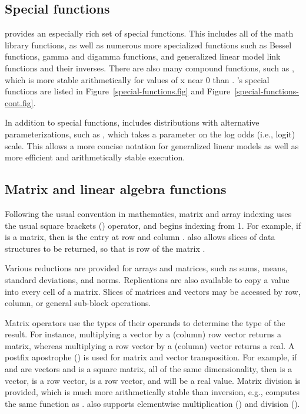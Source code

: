 \documentclass[article]{jss}
\begin{document}
\subsection{Special functions}

 provides an especially rich set of special functions.
This includes all of the  math library functions, as
well as numerous more specialized functions such as Bessel functions,
gamma and digamma functions, and generalized linear model link
functions and their inverses.  There are also many compound functions,
such as , which is more stable arithmetically for
values of x near 0 than .  's special
functions are listed in Figure~\ref{special-functions.fig} and
Figure~\ref{special-functions-cont.fig}.  

In addition to special functions,  includes distributions with
alternative parameterizations, such as , which
takes a parameter on the log odds (i.e., logit) scale.  This allows a
more concise notation for generalized linear models as well as more
efficient and arithmetically stable execution.  


\subsection{Matrix and linear algebra functions}

Following the usual convention in mathematics, matrix and array
indexing uses the usual square brackets (\code{[ ]}) operator, and
begins indexing from 1.  For example, if  is a matrix,
then  is the entry at row  and column
.   also allows slices of data structures to be
returned, so that  is row  of the matrix
.  

Various reductions are provided for arrays and matrices, such as sums,
means, standard deviations, and norms.  Replications are also available
to copy a value into every cell of a matrix.  Slices of matrices and
vectors may be accessed by row, column, or general sub-block
operations.

Matrix operators use the types of their operands to determine the type
of the result.  For instance, multiplying a vector by a (column) row
vector returns a matrix, whereas multiplying a row vector by a
(column) vector returns a real.  A postfix apostrophe () is
used for matrix and vector transposition.  For example, if 
and  are vectors and  is a square matrix, all of
the same dimensionality, then  is a vector,  is a row vector,  is a row vector, and
 will be a real value.  Matrix
division is provided, which is much more arithmetically stable than
inversion, e.g.,  computes the same function
as .   also supports
elementwise multiplication () and division ().
\end{document}
